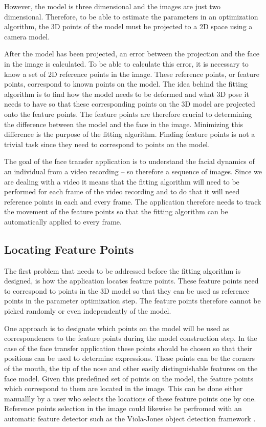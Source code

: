 \documentclass[11pt,a4paper]{report}
\begin{document}
However, the model is three dimensional and the images are just two dimensional. Therefore, to
be able to estimate the parameters in an optimization algorithm, the 3D points
of the model must be projected to a 2D space using a camera model.

After the model has been projected, an error between the projection and the face
in the image is calculated. To be able to calculate this error, it is necessary
to know a set of 2D reference points in the image. These reference points, or feature
points, correspond to known points on the model. The idea behind the
fitting algorithm is to find how the model needs to be deformed and what 3D pose
it needs to have so that these corresponding points on the 3D model are
projected onto the feature points. The feature points are therefore  crucial to
determining the difference between the model and the face in the image. Minimizing this
difference is the purpose of the fitting algorithm. Finding feature points is
not a trivial task since they need to correspond to points on the model.

The goal of the face transfer application is to understand the facial
dynamics of an individual from a video recording -- so therefore a sequence of images. Since we are dealing with a
video it means that the fitting algorithm will need to be performed for
each frame of the video recording and to do that it will need reference points
in each and every frame. The application therefore needs to track the movement
of the feature points so that the fitting algorithm can be automatically applied
to every frame.

\subsection{Locating Feature Points}
The first problem that needs to be addressed before the fitting algorithm is
designed, is how the application locates feature points. These feature points
need to correspond to points in the 3D model so that they can be used as
reference points in the parameter optimization step. The feature points
therefore cannot be picked randomly or even independently of the model.

One approach is to designate which points on
the model will be used as correspondences to the feature points during the model construction
step. In the case of the face transfer application these points should be chosen
so that their positions can be used to determine expressions. These points can
be the corners of the mouth, the tip of the nose and other easily
distinguishable features on the face model. Given this predefined set of points
on the model, the feature points which correspond to them are located in the
image. This can be done either manuallly by a user who selects the locations of
these feature points one by one. Reference points selection in the image could likewise be perfromed with an automatic
feature detector such as the Viola-Jones object detection framework \cite{viola}.
\end{document}
